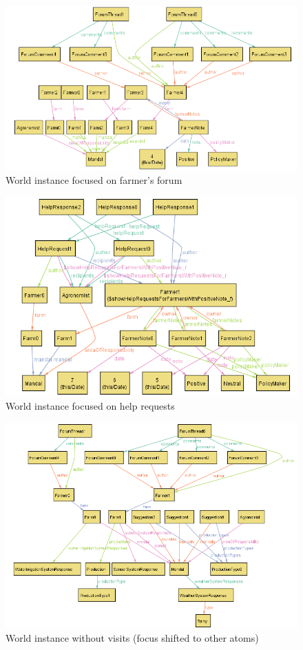 \begin{figure}[H]
    \centering
    \includegraphics[width=\textwidth, keepaspectratio, origin=c]{alloy/world_instances/showWorldFocusedOnForum2.png}
    \caption{World instance focused on farmer's forum}
    \label{fig:forum}
\end{figure}

\begin{figure}[H]
    \centering
    \includegraphics[width=\textwidth, keepaspectratio, origin=c]{alloy/world_instances/showHelpRequestsForFarmersWithPositiveNote2.png}
    \caption{World instance focused on help requests}
    \label{fig:help_requests}
\end{figure}

\begin{figure}[H]
    \centering
    \includegraphics[width=\textwidth, keepaspectratio, origin=c]{alloy/world_instances/General2.png}
    \caption{World instance without visits (focus shifted to other atoms)}
    \label{fig:general_world}
\end{figure}